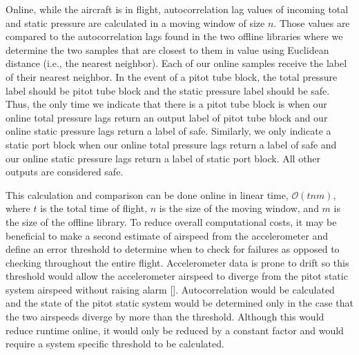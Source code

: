 \documentclass[]{aiaa-tc}
\begin{document}
Online, while the aircraft is in flight, autocorrelation lag values of incoming total and static pressure are calculated in a moving window of size $n$. Those values are compared to the autocorrelation lags found in the two offline libraries where we determine the two samples that are closest to them in value using Euclidean distance (i.e., the nearest neighbor). Each of our online samples receive the label of their nearest neighbor. In the event of a pitot tube block, the total pressure label should be pitot tube block and the static pressure label should be safe. Thus, the only time we indicate that there is a pitot tube block is when our online total pressure lags return an output label of pitot tube block and our online static pressure lags return a label of safe. Similarly, we only indicate a static port block when our online total pressure lags return a label of safe and our online static pressure lags return a label of static port block. All other outputs are considered safe. 

This calculation and comparison can be done online in linear time, $\mathcal{O}(t n  m)$, where $t$ is the total time of flight, $n$ is the size of the moving window, and $m$ is the size of the offline library. To reduce overall computational costs, it may be beneficial to make a second estimate of airspeed from the accelerometer and define an error threshold to determine when to check for failures as opposed to checking throughout the entire flight. Accelerometer data is prone to drift so this threshold would allow the accelerometer airspeed to diverge from the pitot static system airspeed without raising alarm []. Autocorrelation would be calculated and the state of the pitot static system would be determined only in the case that the two airspeeds diverge by more than the threshold. Although this would reduce runtime online, it would only be reduced by a constant factor and would require a system specific threshold to be calculated.
\end{document}
